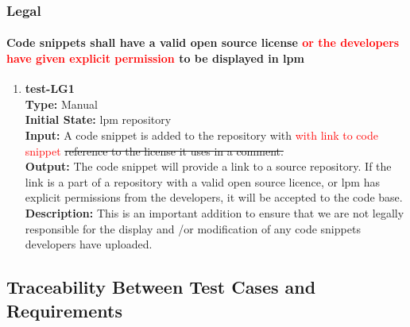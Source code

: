 \documentclass[12pt, titlepage]{article}
\begin{document}
\subsubsection{Legal}
\paragraph{Code snippets shall have a valid open source license \textcolor{red}{or the developers have given explicit permission} to be displayed in lpm}
\begin{enumerate}
    \item{\textbf{test-LG1}\\}
    \textbf{Type:} Manual\\
    \textbf{Initial State:} lpm repository \\
    \textbf{Input:} A code snippet is added to the repository with \textcolor{red}{with link to code snippet} \sout{reference to the license it uses in a comment.} \\
    \textbf{Output:} The code snippet will provide a link to a source repository. If the link is a part of a repository with a valid open source licence, or lpm has explicit permissions from the developers, it will be accepted to the code base.\\
    \textbf{Description:} This is an important addition to ensure that we are not legally responsible for the display and /or modification of any code snippets developers have uploaded.\\
\end{enumerate}

\subsection{Traceability Between Test Cases and Requirements}
\end{document}
